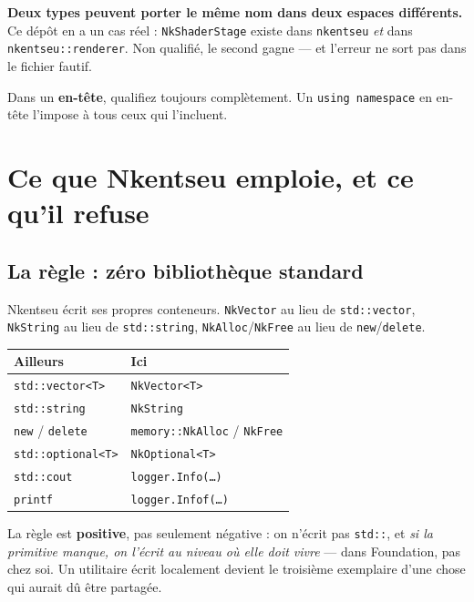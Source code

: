 \begin{nkpiege}
\textbf{Deux types peuvent porter le même nom dans deux espaces différents.} Ce
dépôt en a un cas réel : \texttt{NkShaderStage} existe dans
\texttt{nkentseu} \emph{et} dans \texttt{nkentseu::renderer}. Non qualifié, le
second gagne --- et l'erreur ne sort pas dans le fichier fautif.

Dans un \textbf{en-tête}, qualifiez toujours complètement. Un
\texttt{using namespace} en en-tête l'impose à tous ceux qui l'incluent.
\end{nkpiege}

\section{Ce que Nkentseu emploie, et ce qu'il refuse}

\subsection{La règle : zéro bibliothèque standard}

Nkentseu écrit ses propres conteneurs. \texttt{NkVector} au lieu de
\texttt{std::vector}, \texttt{NkString} au lieu de \texttt{std::string},
\texttt{NkAlloc}/\texttt{NkFree} au lieu de \texttt{new}/\texttt{delete}.

\begin{center}
\begin{tabular}{@{}ll@{}}
\toprule
\textbf{Ailleurs} & \textbf{Ici} \\
\midrule
\texttt{std::vector<T>} & \texttt{NkVector<T>} \\
\texttt{std::string} & \texttt{NkString} \\
\texttt{new} / \texttt{delete} & \texttt{memory::NkAlloc} / \texttt{NkFree} \\
\texttt{std::optional<T>} & \texttt{NkOptional<T>} \\
\texttt{std::cout} & \texttt{logger.Info(\dots)} \\
\texttt{printf} & \texttt{logger.Infof(\dots)} \\
\bottomrule
\end{tabular}
\end{center}

\begin{nkretenir}
La règle est \textbf{positive}, pas seulement négative : on n'écrit pas
\texttt{std::}, et \emph{si la primitive manque, on l'écrit au niveau où elle
doit vivre} --- dans Foundation, pas chez soi. Un utilitaire écrit localement
devient le troisième exemplaire d'une chose qui aurait dû être partagée.
\end{nkretenir}

